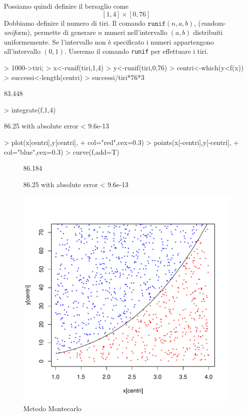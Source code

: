 \documentclass[onecolumn,11pt]{book}
\begin{document}
Possiamo quindi definire il bersaglio come
$$[1,4]\times [0,76]$$
Dobbiamo definire il numero di tiri. 
Il comando $\texttt{runif}(n,a,b)$, ({\it r}andom-{\it unif}orm), permette di generare $n$ numeri nell'intervallo $(a,b)$ distribuiti uniformemente. Se l'intervallo non \`e specificato i numeri appartengono all'intervallo $(0,1)$.
Useremo il comando  \texttt{runif} per effettuare i tiri.

\par
\begin{Schunk}
\begin{Sinput}
> 1000->tiri;
> x<-runif(tiri,1,4)  	 
> y<-runif(tiri,0,76)
> centri<-which(y<f(x))	 
> successi<-length(centri)
> successi/tiri*76*3                    
\end{Sinput}
\begin{Soutput}
[1] 83.448
\end{Soutput}
\begin{Sinput}
> integrate(f,1,4)
\end{Sinput}
\begin{Soutput}
86.25 with absolute error < 9.6e-13
\end{Soutput}
\begin{Sinput}
> plot(x[centri],y[centri],
+ col="red",cex=0.3)   
> points(x[-centri],y[-centri],
+ col="blue",cex=0.3)  
> curve(f,add=T)		
\end{Sinput}
\end{Schunk}
\begin{figure}[htbp]
\begin{center}
\begin{Schunk}
\begin{Soutput}
[1] 86.184
\end{Soutput}
\begin{Soutput}
86.25 with absolute error < 9.6e-13
\end{Soutput}
\end{Schunk}
\includegraphics{statisticaconR-120}
\caption{Metodo Montecarlo }
\label{fig:Montec1}
\end{center}
\end{figure}
\end{document}

